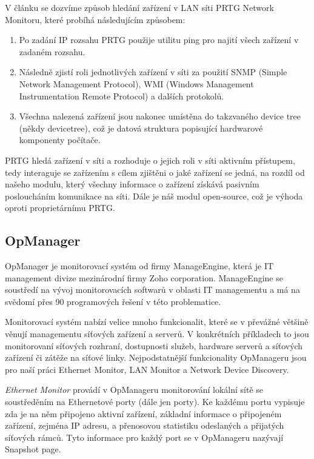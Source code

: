 \documentclass[thesis=B,czech,hidelinks]{FITthesis}[2019/03/21]
\begin{document}
        V článku \cite{PRTGDevice} se dozvíme způsob hledání zařízení v LAN síti PRTG Network Monitoru, které probíhá následujícím způsobem:
        \begin{enumerate}
            \item Po zadání IP rozsahu PRTG použije utilitu ping pro najití všech zařízení v zadaném rozsahu.
            \item Následně zjistí roli jednotlivých zařízení v síti za použití SNMP (Simple Network Management Protocol), WMI (Windows Management Instrumentation Remote Protocol) a dalších protokolů.
            \item Všechna nalezená zařízení jsou nakonec umístěna do takzvaného device tree (někdy devicetree), což je datová struktura popisující hardwarové komponenty počítače.
        \end{enumerate}
        
        PRTG hledá zařízení v síti a rozhoduje o jejich roli v síti aktivním přístupem, tedy interaguje se zařízením s cílem zjištěni o jaké zařízení se jedná, na rozdíl od našeho modulu, který všechny informace o zařízení získává pasivním posloucháním komunikace na síti. Dále je náš modul open-source, což je výhoda oproti proprietárnímu PRTG.
        \subsection{OpManager}
        OpManager je monitorovací systém od firmy ManageEngine, která je IT management divize mezinárodní firmy Zoho corporation. ManageEngine se soustředí na vývoj monitorovacích softwarů v oblasti IT managementu a má na svědomí přes 90 programových řešení v této problematice.
        
        Monitorovací systém nabízí velice mnoho funkcionalit, které se v převážné většině věnují managementu síťových zařízení a serverů. V konkrétních příkladech to jsou monitorovaní síťových rozhraní, dostupnosti služeb, hardware serverů a síťových zařízení či zátěže na síťové linky. Nejpodstatnější funkcionality OpManageru jsou pro naší práci Ethernet Monitor, LAN Monitor a Network Device Discovery. 
        
        \emph{Ethernet Monitor} \cite{OpManagerEthernet} provádí v OpManageru monitorování lokální sítě se soustředěním na Ethernetové porty (dále jen porty). Ke každému portu vypisuje zda je na něm připojeno aktivní zařízení, základní informace o připojeném zařízení, zejména IP adresu, a přenosovou statistiku odeslaných a přijatých síťových rámců. Tyto informace pro každý port se v OpManageru nazývají Snapshot page. 
        
\end{document}

